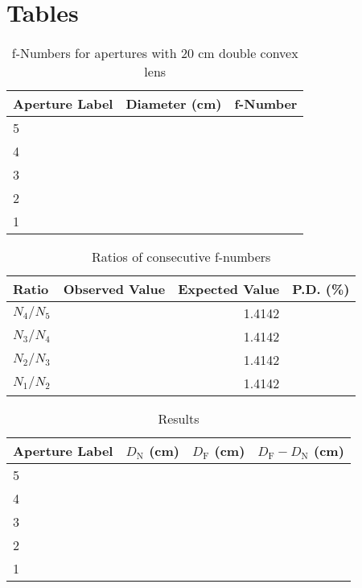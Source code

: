 \section{Tables}
%
\begin{table}[ht]
    \begin{center}
        \begin{tabular}{|l|r|r|}
            \hline
            Aperture Label & Diameter (cm) & f-Number \\
            \hline
            5 & & \\
            4 & & \\
            3 & & \\
            2 & & \\
            1 & & \\
            \hline
        \end{tabular}
    \end{center}
    \caption{f-Numbers for apertures with 20 cm double convex lens}
    \label{table.09.fnumbers}
\end{table}
%
\begin{table}[ht]
    \begin{center}
        \begin{tabular}{|l|r|r|r|}
            \hline
            Ratio & Observed Value & Expected Value & P.D. (\%) \\
            \hline
            $N_{4} / N_{5}$ & & 1.4142 & \\
            $N_{3} / N_{4}$ & & 1.4142 & \\
            $N_{2} / N_{3}$ & & 1.4142 & \\
            $N_{1} / N_{2}$ & & 1.4142 & \\
            \hline
        \end{tabular}
    \end{center}
    \caption{Ratios of consecutive f-numbers}
    \label{table.09.ratios}
\end{table}
%
\begin{table}[ht]
    \begin{center}
        \begin{tabular}{|l|r|r|r|}
            \hline
            Aperture Label & $D_{\text{N}}$ (cm) & $D_{\text{F}}$ (cm) & $D_{\text{F}} - D_{\text{N}}$ (cm) \\
            \hline
            5 & & & \\
            4 & & & \\
            3 & & & \\
            2 & & & \\
            1 & & & \\
            \hline
        \end{tabular}
    \end{center}
    \caption{Results}
    \label{table.09.results}
\end{table}
%